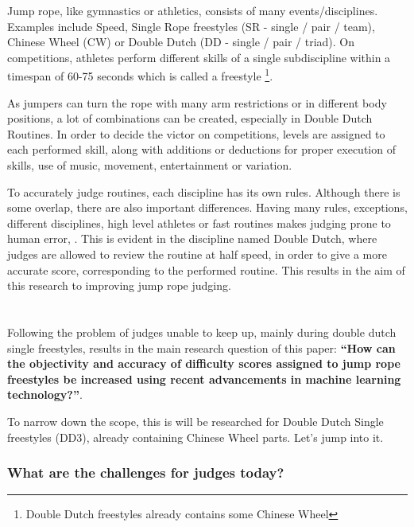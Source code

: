 Jump rope, like gymnastics or athletics, consists of many events/disciplines. Examples include Speed, Single Rope freestyles (SR - single / pair / team), Chinese Wheel (CW) or Double Dutch (DD - single / pair / triad). On competitions, athletes perform different skills of a single subdiscipline within a timespan of 60-75 seconds which is called a freestyle \footnote{Double Dutch freestyles already contains some Chinese Wheel}.

As jumpers can turn the rope with many arm restrictions or in different body positions, a lot of combinations can be created, especially in Double Dutch Routines. In order to decide the victor on competitions, levels are assigned to each performed skill, along with additions or deductions for proper execution of skills, use of music, movement, entertainment or variation.

To accurately judge routines, each discipline has its own rules. Although there is some overlap, there are also important differences.
Having many rules, exceptions, different disciplines, high level athletes or fast routines makes judging prone to human error, \autocite{Heiniger2018}. This is evident in the discipline named Double Dutch, where judges are allowed to review the routine at half speed, in order to give a more accurate score, corresponding to the performed routine. This results in the aim of this research to improving jump rope judging.

\section{}%
\label{sec:onderzoeksvraag}

Following the problem of judges unable to keep up, mainly during double dutch single freestyles, results in the main research question of this paper: \textbf{``How can the objectivity and accuracy of difficulty scores assigned to jump rope freestyles be increased using recent advancements in machine learning technology?''}.

To narrow down the scope, this is will be researched for Double Dutch Single freestyles (DD3), already containing Chinese Wheel parts. Let's jump into it.

\subsubsection{What are the challenges for judges today?}
\label{intro-bp:question-challenges-for-judges}

